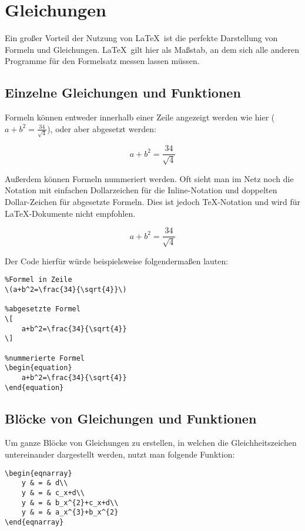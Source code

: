 
\chapter{Gleichungen}
Ein großer Vorteil der Nutzung von \LaTeX\ ist die perfekte Darstellung von Formeln und Gleichungen. 
\LaTeX\ gilt hier als Maßstab, an dem sich alle anderen Programme für den Formelsatz messen lassen müssen.

\section{Einzelne Gleichungen und Funktionen}
Formeln können entweder innerhalb einer Zeile angezeigt werden wie hier (\(a+b^2=\frac{34}{\sqrt{4}}\)), oder aber abgesetzt werden:

\[
    a+b^2=\frac{34}{\sqrt{4}}
\]

Außerdem können Formeln nummeriert werden. 
Oft sieht man im Netz noch die Notation mit einfachen Dollarzeichen für die Inline-Notation und doppelten Dollar-Zeichen für abgesetzte Formeln. 
Dies ist jedoch \TeX-Notation und wird für \LaTeX-Dokumente nicht empfohlen.

\begin{equation}
    a+b^2=\frac{34}{\sqrt{4}}
\end{equation}

Der Code hierfür würde beispielsweise folgendermaßen lauten:
\begin{lstlisting}
%Formel in Zeile
\(a+b^2=\frac{34}{\sqrt{4}}\)

%abgesetzte Formel
\[
    a+b^2=\frac{34}{\sqrt{4}}
\]

%nummerierte Formel
\begin{equation}
    a+b^2=\frac{34}{\sqrt{4}}
\end{equation}
\end{lstlisting}

\section{Blöcke von Gleichungen und Funktionen}

Um ganze Blöcke von Gleichungen zu erstellen, in welchen die Gleichheitszeichen untereinander dargestellt werden, nutzt man folgende Funktion:
\begin{lstlisting}
\begin{eqnarray}
    y & = & d\\
    y & = & c_x+d\\
    y & = & b_x^{2}+c_x+d\\
    y & = & a_x^{3}+b_x^{2}
\end{eqnarray}
\end{lstlisting}

